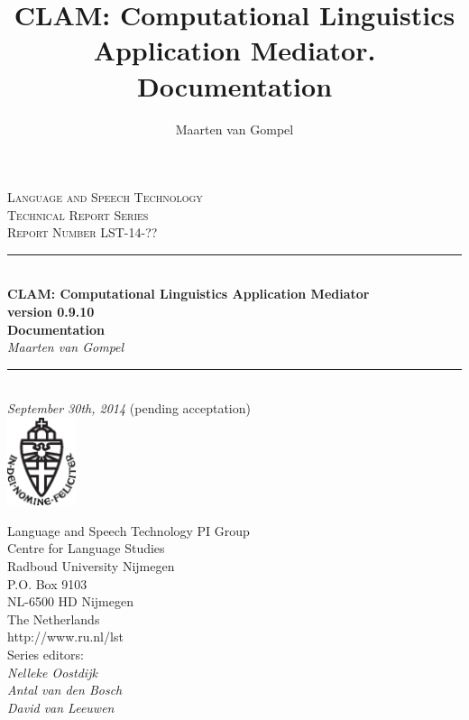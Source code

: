 \documentclass[a4paper,12pt]{report}
\author{Maarten van Gompel}
\title{CLAM: Computational Linguistics Application Mediator. Documentation}
\newcommand{\HRule}{\rule{\linewidth}{0.5mm}} %
\begin{document}
\sffamily

\begin{titlepage}
\begin{center}
\textsc{\large Language and Speech Technology\\ Technical Report Series}\\[1.5cm] 
\textsc{Report Number LST-14-??}\\[0.5cm] 

\HRule \\[0.5cm]
{ \Large \bfseries CLAM: Computational Linguistics Application Mediator}\\[0.5cm] %
{\bf \small version 0.9.10} \\[0.5cm]
{ \Large \bfseries Documentation}\\[0.5cm]
{\large \emph{Maarten van Gompel}}\\[0.5cm]
\HRule \\[1.0cm]

\emph{September 30th, 2014} \small{(pending acceptation)} \\[0.5cm] 
\includegraphics[width=20.0mm]{ru-beeldmerk-zwart.eps}
\end{center}

\begin{minipage}{0.6\textwidth}
\begin{flushleft}
Language and Speech Technology PI Group \\
Centre for Language Studies \\
Radboud University Nijmegen \\
P.O. Box 9103 \\
NL-6500 HD Nijmegen \\
The Netherlands \\
http://www.ru.nl/lst \\[0.3cm]
Series editors: \\
\hspace{0.5cm}\emph{Nelleke Oostdijk}   \\
\hspace{0.5cm}\emph{Antal van den Bosch}  \\
\hspace{0.5cm}\emph{David van Leeuwen}  \\
\end{flushleft}
\end{minipage}

\end{titlepage}
\tableofcontents
\end{document}
